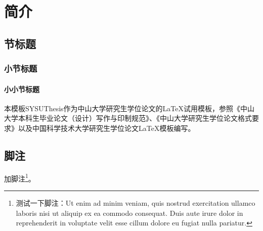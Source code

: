 
\chapter{简介}
\label{cha:introduction}
\section{节标题}
\subsection{小节标题}
\label{ssec:ssection}
\subsubsection{小小节标题}
\label{ssec:sssection}
本模板SYSUThesis作为中山大学研究生学位论文的\LaTeX 试用模板，参照《中山大学本科生毕业论文（设计）写作与印制规范》、《中山大学研究生学位论文格式要求》以及中国科学技术大学研究生学位论文\LaTeX 模板编写。

\section{脚注}
\label{sec:footnote}
加脚注\footnote{测试一下脚注：Ut enim ad minim veniam, quis nostrud exercitation ullamco laboris nisi ut aliquip ex ea commodo consequat. Duis aute irure dolor in reprehenderit in voluptate velit esse cillum dolore eu fugiat nulla pariatur.}。

